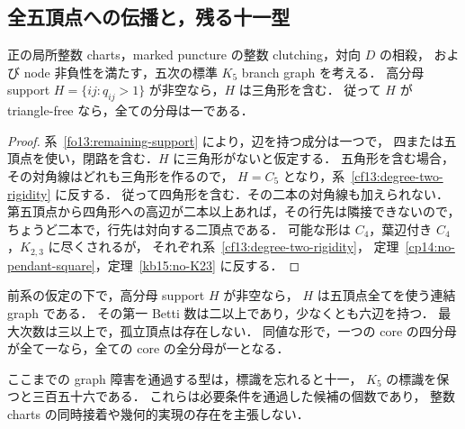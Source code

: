 \subsection{全五頂点への伝播と，残る十一型}
\label{sf17:section}

\begin{corollary}[三角形の必要性]
\label{sf17:triangle-required}
正の局所整数 charts，marked puncture の整数 clutching，対向 $D$ の相殺，
および node 非負性を満たす，五次の標準 $K_5$ branch graph を考える．
高分母 support $H=\{ij:q_{ij}>1\}$ が非空なら，$H$ は三角形を含む．
従って $H$ が triangle-free なら，全ての分母は一である．
\end{corollary}

\begin{proof}
系~\ref{fo13:remaining-support} により，辺を持つ成分は一つで，
四または五頂点を使い，閉路を含む．$H$ に三角形がないと仮定する．
五角形を含む場合，その対角線はどれも三角形を作るので，
$H=C_5$ となり，系~\ref{cf13:degree-two-rigidity} に反する．
従って四角形を含む．その二本の対角線も加えられない．
第五頂点から四角形への高辺が二本以上あれば，その行先は隣接できないので，
ちょうど二本で，行先は対向する二頂点である．
可能な形は $C_4$，葉辺付き $C_4$，$K_{2,3}$ に尽くされるが，
それぞれ系~\ref{cf13:degree-two-rigidity}，
定理~\ref{cp14:no-pendant-square}，定理~\ref{kb15:no-K23} に反する．
\end{proof}

\begin{corollary}
\label{sf17:remaining-support}
前系の仮定の下で，高分母 support $H$ が非空なら，
$H$ は五頂点全てを使う連結 graph である．
その第一 Betti 数は二以上であり，少なくとも六辺を持つ．
最大次数は三以上で，孤立頂点は存在しない．
同値な形で，一つの core の四分母が全て一なら，全ての core の全分母が一となる．

ここまでの graph 障害を通過する型は，標識を忘れると十一，
$K_5$ の標識を保つと三百五十六である．
これらは必要条件を通過した候補の個数であり，
整数 charts の同時接着や幾何的実現の存在を主張しない．
\end{corollary}

